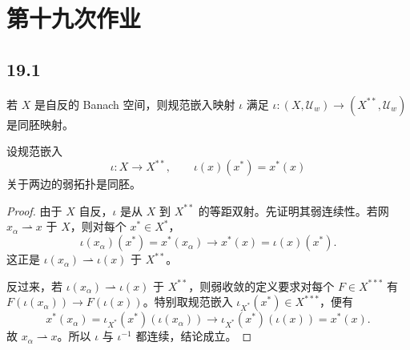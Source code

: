 \section{第十九次作业}

\subsection*{19.1}
\begin{problem}
若 $X$ 是自反的 Banach 空间，则规范嵌入映射 $\iota$ 满足
$\iota:(X,\mathcal U_w)\to(X^{**},\mathcal U_w)$ 是同胚映射。
\end{problem}

设规范嵌入
\[
 \iota:X\longrightarrow X^{**},\qquad \iota(x)(x^*)=x^*(x)
\]
关于两边的弱拓扑是同胚。

\begin{proof}
由于 $X$ 自反，$\iota$ 是从 $X$ 到 $X^{**}$ 的等距双射。先证明其弱连续性。若网
$x_\alpha\rightharpoonup x$ 于 $X$，则对每个 $x^*\in X^*$，
\[
 \iota(x_\alpha)(x^*)=x^*(x_\alpha)\longrightarrow x^*(x)=\iota(x)(x^*).
\]
这正是 $\iota(x_\alpha)\rightharpoonup\iota(x)$ 于 $X^{**}$。

反过来，若 $\iota(x_\alpha)\rightharpoonup\iota(x)$ 于 $X^{**}$，则弱收敛的定义要求对每个
$F\in X^{***}$ 有 $F(\iota(x_\alpha))\to F(\iota(x))$。特别取规范嵌入
$\iota_{X^*}(x^*)\in X^{***}$，便有
\[
 x^*(x_\alpha)=\iota_{X^*}(x^*)(\iota(x_\alpha))
 \longrightarrow \iota_{X^*}(x^*)(\iota(x))=x^*(x).
\]
故 $x_\alpha\rightharpoonup x$。所以 $\iota$ 与 $\iota^{-1}$ 都连续，结论成立。
\end{proof}

